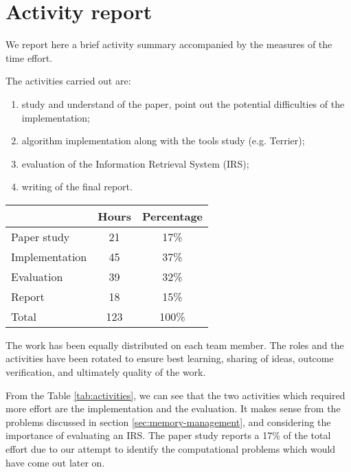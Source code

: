 \section{Activity report}
We report here a brief activity summary accompanied by the measures of the time effort.

The activities carried out are:

\begin{enumerate}
    \item study and understand of the paper, point out the potential difficulties of the implementation;
    \item algorithm implementation along with the tools study (e.g. Terrier);
    \item evaluation of the Information Retrieval System (IRS);
    \item writing of the final report.
\end{enumerate}

\begin{center}
   \begin{tabular}{| l | c | c |}
    \hline
    & Hours & Percentage\\ \hline
    Paper study & 21 & 17\%\\ \hline
    Implementation & 45 & 37\%\\ \hline
    Evaluation & 39 & 32\%\\ \hline
    Report & 18 & 15\%\\ \hline
    Total & 123 & 100\%\\ \hline
    \end{tabular}
    \label{tab:activities}
\end{center}

The work has been equally distributed on each team member. The roles and the activities have been rotated to ensure best learning, sharing of ideas, outcome verification, and ultimately quality of the work.

From the Table \ref{tab:activities}, we can see that the two activities which required more effort are the implementation and the evaluation. It makes sense from the problems discussed in section \ref{sec:memory-management}, and considering the importance of evaluating an IRS. The paper study reports a 17\% of the total effort due to our attempt to identify the computational problems which would have come out later on.